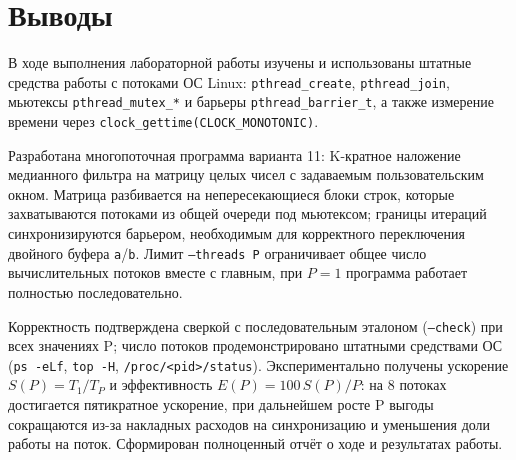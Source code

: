 \section{Выводы}

В ходе выполнения лабораторной работы изучены и использованы штатные средства работы с
потоками ОС Linux: \texttt{pthread\_create}, \texttt{pthread\_join}, мьютексы
\texttt{pthread\_mutex\_*} и барьеры \texttt{pthread\_barrier\_t}, а также измерение времени
через \texttt{clock\_gettime(CLOCK\_MONOTONIC)}.

Разработана многопоточная программа варианта 11: K-кратное наложение медианного фильтра на
матрицу целых чисел с задаваемым пользовательским окном. Матрица разбивается на
непересекающиеся блоки строк, которые захватываются потоками из общей очереди под мьютексом;
границы итераций синхронизируются барьером, необходимым для корректного переключения двойного
буфера \texttt{a}/\texttt{b}. Лимит \texttt{--threads P} ограничивает общее число вычислительных
потоков вместе с главным, при $P=1$ программа работает полностью последовательно.

Корректность подтверждена сверкой с последовательным эталоном (\texttt{--check}) при всех
значениях P; число потоков продемонстрировано штатными средствами ОС (\texttt{ps -eLf},
\texttt{top -H}, \texttt{/proc/<pid>/status}). Экспериментально получены ускорение
$S(P)=T_1/T_P$ и эффективность $E(P)=100\,S(P)/P$: на 8 потоках достигается пятикратное
ускорение, при дальнейшем росте P выгоды сокращаются из-за накладных расходов на синхронизацию
и уменьшения доли работы на поток. Сформирован полноценный отчёт о ходе и результатах работы.
\pagebreak
